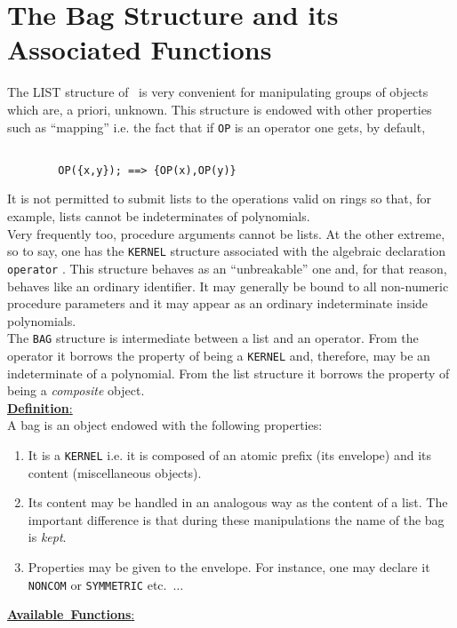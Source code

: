 \section{ The Bag Structure and its Associated Functions}
The LIST structure of \REDUCE\ is very convenient for manipulating
groups of objects which are, a priori, unknown. This structure is
endowed with other properties such as ``mapping'' i.e. the fact that
if \verb+OP+ is an operator one gets, by default,
\begin{verbatim}

        OP({x,y}); ==> {OP(x),OP(y)}

\end{verbatim}
It is not permitted to submit lists to the operations valid on rings
so that, for example, lists cannot be indeterminates of polynomials.\\
Very frequently too, procedure arguments cannot be lists.
At the other extreme, so to say, one has the \verb+KERNEL+
structure associated
with the algebraic declaration \verb+operator+ .  This structure behaves as
an ``unbreakable'' one and, for that reason, behaves
like an ordinary identifier.
It may generally be bound to all non-numeric procedure parameters
and it may appear
as an ordinary indeterminate inside polynomials. \\
The \verb+BAG+ structure is intermediate between a list and an operator.
From the operator it borrows the property of being a \verb+KERNEL+ and,
therefore, may be an indeterminate of a polynomial. From the list structure
it borrows the property of being a {\em composite} object.\\[5pt]
\mbox{\underline{{\bf Definition}:\hfill}}\\[4pt]
A bag is an object endowed with the following properties:
\begin{enumerate}
\item It is a \verb+KERNEL+ i.e. it is  composed of an atomic prefix (its
envelope) and
its content (miscellaneous objects).
\item Its content may be handled in an analogous way as the content of a
list. The important difference is that during these manipulations 
the name of the bag is {\em kept}.
\item Properties may be given to the envelope. For instance, one may
declare it \verb+NONCOM+ or \verb+SYMMETRIC+ etc.\ $\ldots$
\end{enumerate}
\vspace{5pt}
\mbox{\underline{{\bf Available Functions}:\hfill}}
\bi
